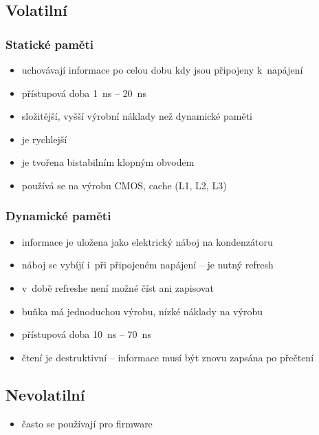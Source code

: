 \documentclass[a4paper,12pt]{article}
\providecommand{\tightlist}{%
\setlength{\itemsep}{0pt}\setlength{\parskip}{0pt}}
\begin{document}
\subsection{Volatilní}

\subsubsection{Statické paměti}

\begin{itemize}
\tightlist
\item uchovávají informace po celou dobu kdy jsou připojeny k~napájení
\item přístupová doba 1~ns -- 20~ns
\item složitější, vyšší výrobní náklady než dynamické paměti
\item je rychlejší
\item je tvořena bistabilním klopným obvodem
\item používá se na výrobu CMOS, cache (L1, L2, L3)
\end{itemize}

\subsubsection{Dynamické paměti}

\begin{itemize}
\tightlist
\item informace je uložena jako elektrický náboj na kondenzátoru
\item náboj se vybíjí i~při připojeném napájení -- je nutný refresh
\item v~době refreshe není možné číst ani zapisovat
\item buňka má jednoduchou výrobu, nízké náklady na výrobu
\item přístupová doba 10~ns -- 70~ns
\item čtení je destruktivní -- informace musí být znovu zapsána po přečtení
\end{itemize}

\subsection{Nevolatilní}

\begin{itemize}
\tightlist
\item často se používají pro firmware
\end{itemize}
\end{document}
